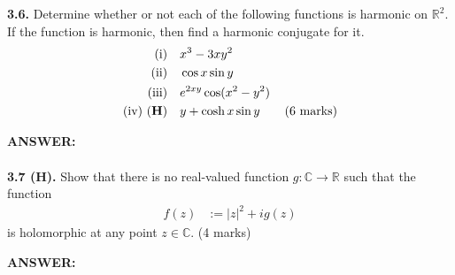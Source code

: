 \documentclass[12pt,a4paper]{article}
\begin{document}
\newpage
\noindent\textbf{3.6.} Determine whether or not each of the following functions is harmonic on \(\mathbb{R}^2\). If the function is harmonic, then find a harmonic conjugate for it.
\begin{align*}
\text{(i)}\quad &x^3-3xy^2\\
\text{(ii)}\quad &\cos x\sin y\\
\text{(iii)}\quad &e^{2xy}\cos(x^2-y^2)\\
\text{(iv) (\textbf{H})}\quad &y+\cosh x\sin y \qquad \text{(6 marks)}
\end{align*}

\vspace{1cm}

\textbf{ANSWER:}\\
\\

\newpage
\noindent\textbf{3.7 (H).} Show that there is no real-valued function \(g:\mathbb{C}\to\mathbb{R}\) such that the function
\begin{align*}
f(z)&:=|z|^2+ig(z)
\end{align*}
is holomorphic at any point \(z\in\mathbb{C}\). \hfill (4 marks)

\vspace{1cm}

\textbf{ANSWER:}\\
\\
\end{document}
